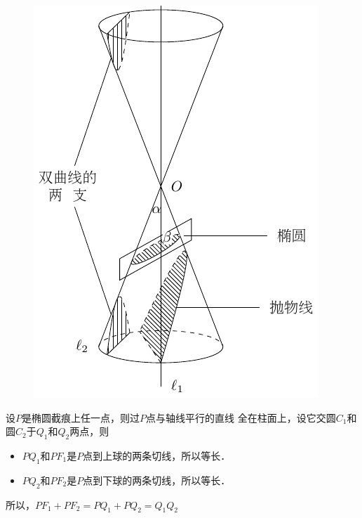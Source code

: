 \begin{figure}[ht]
\begin{minipage}[t]{0.48\textwidth}
    \caption{}
    \end{minipage}
    \begin{minipage}[t]{0.48\textwidth}
    \centering
    \includegraphics{2-conic-section-all.pdf}
    \caption{}
    \end{minipage}
\end{figure}

设$P$是椭圆截痕上任一点，则过$P$点与轴线平行的直线
全在柱面上，设它交圆$C_1$和圆$C_2$于$Q_1$和$Q_2$两点，则
\begin{itemize}
    \item $PQ_1$和$PF_1$是$P$点到上球的两条切线，所以等长．
    \item   $PQ_2$和$PF_2$是$P$点到下球的两条切线，所以等长．
\end{itemize}

所以，$PF_1+PF_2=PQ_1+PQ_2=Q_1Q_2$

